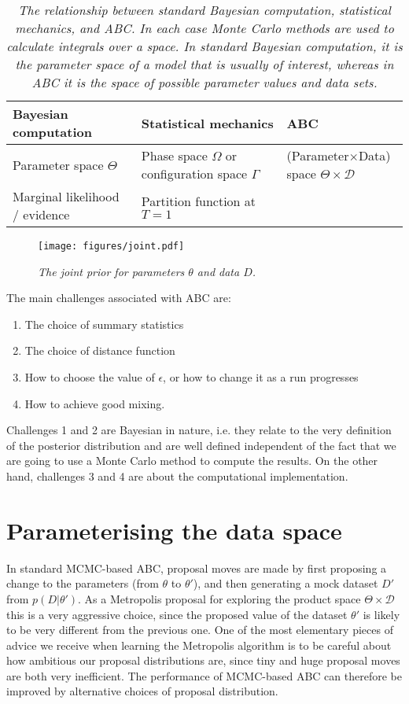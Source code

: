 \documentclass[article]{jss}
\newcommand{\params}{\theta}
\newcommand{\data}{D}
\begin{document}
\begin{table}[ht!]
\centering
\small
\begin{tabular}{lll}
\hline
Bayesian computation		&		Statistical mechanics		&		ABC\\
\hline
Parameter space	$\Theta$	&		Phase space	$\Omega$ or configuration space $\Gamma$ 			& (Parameter$\times$Data) space $\Theta \times \mathcal{D}$\\		
Marginal likelihood / evidence	&	Partition function at $T=1$	&\\


\end{tabular}
\caption{\it The relationship between standard Bayesian computation, statistical
mechanics, and ABC. In each case Monte Carlo methods are used to calculate
integrals over a space. In standard Bayesian computation, it is the parameter
space of a model that is usually of interest, whereas in ABC it is the space
of possible parameter values {\it and} data sets.
\label{tab:relation}}
\end{table}


\begin{figure}[ht!]
\centering
\texttt{[image: figures/joint.pdf]}
\caption{\it The joint prior for parameters $\params$ and data $\data$.
\label{fig:joint}}
\end{figure}

The main challenges associated with ABC are:
\begin{enumerate}
\item The choice of summary statistics
\item The choice of distance function
\item How to choose the value of $\epsilon$, or how to change it as a run
progresses
\item How to achieve good mixing.
\end{enumerate}
Challenges 1 and 2 are Bayesian in nature, i.e. they relate to the very
definition of the posterior distribution and are well defined independent of
the fact that we are going to use a Monte Carlo method to compute the
results. On the other hand, challenges 3 and 4 are about the computational implementation.

\section{Parameterising the data space}
In standard MCMC-based ABC, proposal moves are made by first proposing a
change to the parameters (from $\params$ to $\params'$), and then generating
a mock dataset $\data'$ from $p(\data | \params')$. As a Metropolis proposal
for exploring the product space $\Theta \times \mathcal{D}$ this is a very
aggressive choice, since the proposed value of the
dataset $\params'$ is likely to be very different from the previous one.
One of the most elementary pieces of advice we receive when learning the
Metropolis algorithm is to be careful about how ambitious our proposal
distributions are, since tiny and huge proposal moves are both very
inefficient. The performance of MCMC-based ABC can therefore be improved by
alternative choices of proposal distribution.
\end{document}
